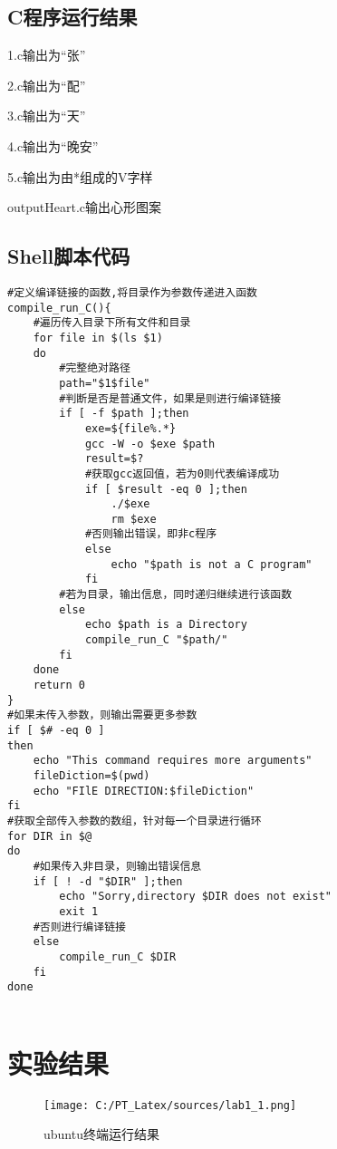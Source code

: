 \documentclass[UTF8]{ctexart}
\begin{document}
    \subsection{C程序运行结果}
        1.c输出为“张”\par
        2.c输出为“配”\par
        3.c输出为“天”\par
        4.c输出为“晚安”\par
        5.c输出为由*组成的V字样\par
        outputHeart.c输出心形图案\par
    \subsection{Shell脚本代码}
    \begin{lstlisting}
#定义编译链接的函数,将目录作为参数传递进入函数
compile_run_C(){
    #遍历传入目录下所有文件和目录
    for file in $(ls $1) 
    do  
        #完整绝对路径
        path="$1$file"
        #判断是否是普通文件，如果是则进行编译链接
        if [ -f $path ];then
            exe=${file%.*}
            gcc -W -o $exe $path
            result=$?
            #获取gcc返回值，若为0则代表编译成功
            if [ $result -eq 0 ];then
                ./$exe
                rm $exe
            #否则输出错误，即非c程序
            else
                echo "$path is not a C program"
            fi
        #若为目录，输出信息，同时递归继续进行该函数	
        else
            echo $path is a Directory
            compile_run_C "$path/"
        fi
    done
    return 0
}
#如果未传入参数，则输出需要更多参数
if [ $# -eq 0 ]
then
    echo "This command requires more arguments"
    fileDiction=$(pwd)  
    echo "FIlE DIRECTION:$fileDiction"
fi
#获取全部传入参数的数组，针对每一个目录进行循环
for DIR in $@ 
do
    #如果传入非目录，则输出错误信息
    if [ ! -d "$DIR" ];then
        echo "Sorry,directory $DIR does not exist"
        exit 1
    #否则进行编译链接
    else
        compile_run_C $DIR 
    fi
done
        
    \end{lstlisting}
    \newpage
    \section{实验结果}
    \begin{figure}[h]
        \centering
        \texttt{[image: C:/PT\_Latex/sources/lab1\_1.png]}
        \caption{ubuntu终端运行结果}
    \end{figure}
\end{document}
